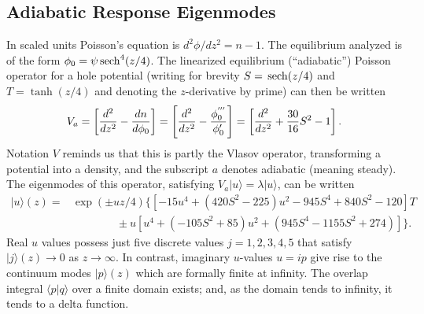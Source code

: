 \documentclass[12pt]{article}
\def\ket#1{|#1\rangle}
\def\bra#1{\langle#1}
\def\sech{{\,\rm sech}}
\begin{document}
\subsection{Adiabatic Response Eigenmodes}
In scaled units Poisson's equation is $d^2\phi/dz^2=n-1$. The
equilibrium analyzed is of the form $\phi_0=\psi\sech^4(z/4)$.  The linearized
equilibrium (``adiabatic'') Poisson operator for a hole potential
(writing for brevity $S=\sech(z/4)$ and $T=\tanh(z/4)$ and denoting
the $z$-derivative by prime) can then be written
\begin{equation}
  \label{eq:1}
  V_a = \left[{d^2\over dz^2} - {dn\over d\phi_0}\right]
  = \left[{d^2\over dz^2} - {\phi_0^{'''}\over \phi_0'}\right]
  = \left[{d^2\over dz^2} +{30\over 16}S^2- 1\right].
\end{equation}
Notation $V$ reminds us that this is partly the Vlasov operator,
transforming a potential into a density, and the subscript $a$ denotes
adiabatic (meaning steady).  The eigenmodes of this
operator, satisfying $V_a\ket{u}=\lambda \ket{u}$, can be written
\begin{equation}
  \label{eq:2}
  \begin{split}
 \ket{u}(z)= &\exp(\pm uz/4)\{[-15u^4 + (420S^2 - 225)u^2 - 945S^4 +
 840S^2 - 120]T \\
 &\qquad\qquad\pm u[u^4 + (-105S^2 + 85)u^2 + (945S^4 - 1155S^2
 +274)]\}
.
  \end{split}
\end{equation}
Real $u$ values possess just five discrete values $j=1,2,3,4,5$ that
satisfy $\ket{j}(z)\to0$ as $z\to\infty$. In contrast, imaginary
$u$-values $u=ip$ give rise to the continuum modes $\ket{p}(z)$ which
are formally finite at infinity. The overlap integral $\bra{p}\ket{q}$
over a finite domain exists; and, as the domain tends to infinity, it tends
to a delta function.
\end{document}
